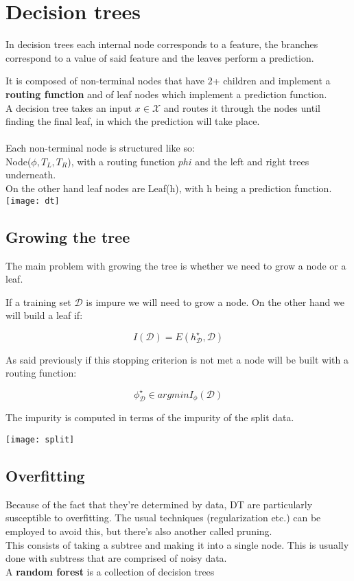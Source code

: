 \chapter{Decision trees}
In decision trees each internal node corresponds to a feature, the branches correspond to a value of said feature and the leaves perform a prediction. 

It is composed of non-terminal nodes that have 2+ children and implement a {\bf routing function} and of leaf nodes which implement a prediction function.\\
A decision tree takes an input $x \in \mathscr{X}$ and routes it through the nodes until finding the final leaf, in which the prediction will take place.
\\
\\
Each non-terminal node is structured like so: \\
Node($\phi, T_L, T_R$), with a routing function $phi$ and the left and right trees underneath.
\\
On the other hand leaf nodes are Leaf(h), with h being a prediction function.
\texttt{[image: dt]}

\section{Growing the tree}
The main problem with growing the tree is whether we need to grow a node or a leaf. 

If a training set $\mathscr{D}$ is impure we will need to grow a node. On the other hand we will build a leaf if:

\[
I(\mathscr{D}) = E(h_{\mathscr{D}}^{\star}, \mathscr{D})
\]

As said previously if this stopping criterion is not met a node will be built with a routing function: 

\[
\phi_{\mathscr{D}}^\star \in argmin I_\phi (\mathscr{D})
\]

The impurity is computed in terms of the impurity of the split data.

\texttt{[image: split]}

\section{Overfitting}
Because of the fact that they're determined by data, DT are particularly susceptible to overfitting. The usual techniques (regularization etc.) can be employed to avoid this, but there's also another called pruning.\\
This consists of taking a subtree and making it into a single node. This is usually done with subtress that are comprised of noisy data. \\
A {\bf random forest} is a collection of decision trees 